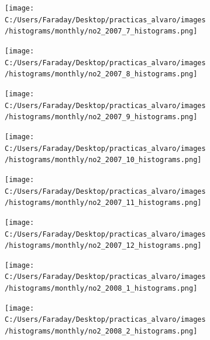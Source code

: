 \documentclass[12pt]{article}
\begin{document}
\newpage

\begin{figure}[H]
\centering
\begin{subfigure}[h]{0.45\textwidth}
\texttt{[image: C:/Users/Faraday/Desktop/practicas\_alvaro/images/histograms/monthly/no2\_2007\_7\_histograms.png]}
\caption{}
\label{fig:hist-mon-1-7-2007}
\end{subfigure}
%
\begin{subfigure}[H]{0.45\textwidth}
\texttt{[image: C:/Users/Faraday/Desktop/practicas\_alvaro/images/histograms/monthly/no2\_2007\_8\_histograms.png]}
\caption{}
\label{fig:hist-mon-1-8-2007}
\end{subfigure}
\caption{}
\end{figure}

\begin{figure}[H]
\centering
\begin{subfigure}[h]{0.45\textwidth}
\texttt{[image: C:/Users/Faraday/Desktop/practicas\_alvaro/images/histograms/monthly/no2\_2007\_9\_histograms.png]}
\caption{}
\label{fig:hist-mon-1-9-2007}
\end{subfigure}
%
\begin{subfigure}[H]{0.45\textwidth}
\texttt{[image: C:/Users/Faraday/Desktop/practicas\_alvaro/images/histograms/monthly/no2\_2007\_10\_histograms.png]}
\caption{}
\label{fig:hist-mon-1-10-2007}
\end{subfigure}
\caption{}
\end{figure}

\begin{figure}[H]
\centering
\begin{subfigure}[h]{0.45\textwidth}
\texttt{[image: C:/Users/Faraday/Desktop/practicas\_alvaro/images/histograms/monthly/no2\_2007\_11\_histograms.png]}
\caption{}
\label{fig:hist-mon-1-11-2007}
\end{subfigure}
%
\begin{subfigure}[H]{0.45\textwidth}
\texttt{[image: C:/Users/Faraday/Desktop/practicas\_alvaro/images/histograms/monthly/no2\_2007\_12\_histograms.png]}
\caption{}
\label{fig:hist-mon-1-12-2007}
\end{subfigure}
\caption{}
\end{figure}

\newpage

\begin{figure}[H]
\centering
\begin{subfigure}[h]{0.45\textwidth}
\texttt{[image: C:/Users/Faraday/Desktop/practicas\_alvaro/images/histograms/monthly/no2\_2008\_1\_histograms.png]}
\caption{}
\label{fig:hist-mon-1-1-2008}
\end{subfigure}
%
\begin{subfigure}[H]{0.45\textwidth}
\texttt{[image: C:/Users/Faraday/Desktop/practicas\_alvaro/images/histograms/monthly/no2\_2008\_2\_histograms.png]}
\caption{}
\label{fig:hist-mon-1-2-2008}
\end{subfigure}
\caption{}
\end{figure}
\end{document}
